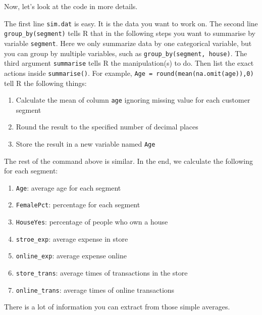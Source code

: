 \documentclass[
  12pt,
]{krantz}
\providecommand{\tightlist}{%
  \setlength{\itemsep}{0pt}\setlength{\parskip}{0pt}}
\begin{document}
Now, let's look at the code in more details.

The first line \texttt{sim.dat} is easy. It is the data you want to work on. The second line \texttt{group\_by(segment)} tells R that in the following steps you want to summarise by variable \texttt{segment}. Here we only summarize data by one categorical variable, but you can group by multiple variables, such as \texttt{group\_by(segment,\ house)}. The third argument \texttt{summarise} tells R the manipulation(s) to do. Then list the exact actions inside \texttt{summarise()}. For example, \texttt{Age\ =\ round(mean(na.omit(age)),0)} tell R the following things:

\begin{enumerate}
\def\labelenumi{\arabic{enumi}.}
\tightlist
\item
  Calculate the mean of column \texttt{age} ignoring missing value for each customer segment
\item
  Round the result to the specified number of decimal places
\item
  Store the result in a new variable named \texttt{Age}
\end{enumerate}

The rest of the command above is similar. In the end, we calculate the following for each segment:

\begin{enumerate}
\def\labelenumi{\arabic{enumi}.}
\tightlist
\item
  \texttt{Age}: average age for each segment
\item
  \texttt{FemalePct}: percentage for each segment
\item
  \texttt{HouseYes}: percentage of people who own a house
\item
  \texttt{stroe\_exp}: average expense in store
\item
  \texttt{online\_exp}: average expense online
\item
  \texttt{store\_trans}: average times of transactions in the store
\item
  \texttt{online\_trans}: average times of online transactions
\end{enumerate}

There is a lot of information you can extract from those simple averages.
\end{document}
